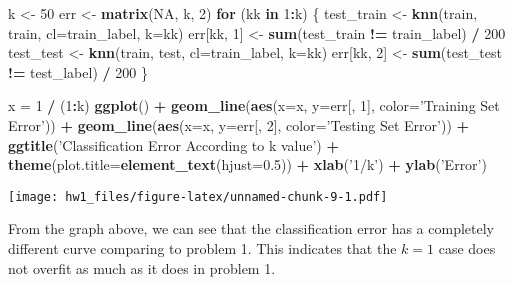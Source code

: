 \documentclass[]{article}
\newenvironment{Shaded}{\begin{snugshade}}{\end{snugshade}}
\newcommand{\ControlFlowTok}[1]{\textcolor[rgb]{0.13,0.29,0.53}{\textbf{#1}}}
\newcommand{\DataTypeTok}[1]{\textcolor[rgb]{0.13,0.29,0.53}{#1}}
\newcommand{\DecValTok}[1]{\textcolor[rgb]{0.00,0.00,0.81}{#1}}
\newcommand{\FloatTok}[1]{\textcolor[rgb]{0.00,0.00,0.81}{#1}}
\newcommand{\KeywordTok}[1]{\textcolor[rgb]{0.13,0.29,0.53}{\textbf{#1}}}
\newcommand{\NormalTok}[1]{#1}
\newcommand{\OperatorTok}[1]{\textcolor[rgb]{0.81,0.36,0.00}{\textbf{#1}}}
\newcommand{\OtherTok}[1]{\textcolor[rgb]{0.56,0.35,0.01}{#1}}
\newcommand{\StringTok}[1]{\textcolor[rgb]{0.31,0.60,0.02}{#1}}
\begin{document}
\begin{Shaded}
\begin{Highlighting}[]
\NormalTok{k <-}\StringTok{ }\DecValTok{50}
\NormalTok{err <-}\StringTok{ }\KeywordTok{matrix}\NormalTok{(}\OtherTok{NA}\NormalTok{, k, }\DecValTok{2}\NormalTok{)}
\ControlFlowTok{for}\NormalTok{ (kk }\ControlFlowTok{in} \DecValTok{1}\OperatorTok{:}\NormalTok{k) \{}
\NormalTok{  test_train <-}\StringTok{ }\KeywordTok{knn}\NormalTok{(train, train, }\DataTypeTok{cl=}\NormalTok{train_label, }\DataTypeTok{k=}\NormalTok{kk)}
\NormalTok{  err[kk, }\DecValTok{1}\NormalTok{] <-}\StringTok{ }\KeywordTok{sum}\NormalTok{(test_train }\OperatorTok{!=}\StringTok{ }\NormalTok{train_label) }\OperatorTok{/}\StringTok{ }\DecValTok{200}
\NormalTok{  test_test <-}\StringTok{ }\KeywordTok{knn}\NormalTok{(train, test, }\DataTypeTok{cl=}\NormalTok{train_label, }\DataTypeTok{k=}\NormalTok{kk)}
\NormalTok{  err[kk, }\DecValTok{2}\NormalTok{] <-}\StringTok{ }\KeywordTok{sum}\NormalTok{(test_test }\OperatorTok{!=}\StringTok{ }\NormalTok{test_label) }\OperatorTok{/}\StringTok{ }\DecValTok{200}
\NormalTok{\}}

\NormalTok{x =}\StringTok{ }\DecValTok{1} \OperatorTok{/}\StringTok{ }\NormalTok{(}\DecValTok{1}\OperatorTok{:}\NormalTok{k)}
\KeywordTok{ggplot}\NormalTok{() }\OperatorTok{+}\StringTok{ }\KeywordTok{geom_line}\NormalTok{(}\KeywordTok{aes}\NormalTok{(}\DataTypeTok{x=}\NormalTok{x, }\DataTypeTok{y=}\NormalTok{err[, }\DecValTok{1}\NormalTok{], }\DataTypeTok{color=}\StringTok{'Training Set Error'}\NormalTok{)) }\OperatorTok{+}\StringTok{ }\KeywordTok{geom_line}\NormalTok{(}\KeywordTok{aes}\NormalTok{(}\DataTypeTok{x=}\NormalTok{x, }\DataTypeTok{y=}\NormalTok{err[, }\DecValTok{2}\NormalTok{], }\DataTypeTok{color=}\StringTok{'Testing Set Error'}\NormalTok{)) }\OperatorTok{+}\StringTok{ }\KeywordTok{ggtitle}\NormalTok{(}\StringTok{'Classification Error According to k value'}\NormalTok{) }\OperatorTok{+}\StringTok{ }\KeywordTok{theme}\NormalTok{(}\DataTypeTok{plot.title=}\KeywordTok{element_text}\NormalTok{(}\DataTypeTok{hjust=}\FloatTok{0.5}\NormalTok{)) }\OperatorTok{+}\StringTok{ }\KeywordTok{xlab}\NormalTok{(}\StringTok{'1/k'}\NormalTok{) }\OperatorTok{+}\StringTok{ }\KeywordTok{ylab}\NormalTok{(}\StringTok{'Error'}\NormalTok{)}
\end{Highlighting}
\end{Shaded}

\texttt{[image: hw1\_files/figure-latex/unnamed-chunk-9-1.pdf]}

From the graph above, we can see that the classification error has a
completely different curve comparing to problem 1. This indicates that
the \(k=1\) case does not overfit as much as it does in problem 1.
\end{document}
